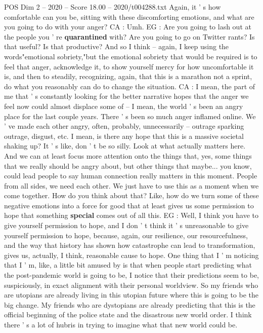 \begin{textsample}{POS Dim 2 – 2020 – Score 18.00 – 2020/t004288.txt}
Again, it ' s how comfortable can you be, sitting with these discomforting emotions, and what are you going to do with your anger?
CA : Umh.
EG : Are you going to lash out at the people you ' re \textbf{quarantined} with?
Are you going to go on Twitter rants?
Is that useful?
Is that productive?
And so I think -- again, I keep using the words"emotional sobriety,"but the emotional sobriety that would be required is to feel that anger, acknowledge it, to show yourself mercy for how uncomfortable it is, and then to steadily, recognizing, again, that this is a marathon not a sprint, do what you reasonably can do to change the situation.
CA : I mean, the part of me that ' s constantly looking for the better narrative hopes that the anger we feel now could almost displace some of -- I mean, the world ' s been an angry place for the last couple years.
There ' s been so much anger inflamed online.
We ' ve made each other angry, often, probably, unnecessarily -- outrage sparking outrage, disgust, etc.
I mean, is there any hope that this is a massive societal shaking up?
It ' s like, don ' t be so silly.
Look at what actually matters here.
And we can at least focus more attention onto the things that, yes, some things that we really should be angry about, but other things that maybe... you know, could lead people to say human connection really matters in this moment.
People from all sides, we need each other.
We just have to use this as a moment when we come together.
How do you think about that?
Like, how do we turn some of these negative emotions into a force for good that at least gives us some permission to hope that something \textbf{special} comes out of all this.
EG : Well, I think you have to give yourself permission to hope, and I don ' t think it ' s unreasonable to give yourself permission to hope, because, again, our resilience, our resourcefulness, and the way that history has shown how catastrophe can lead to transformation, gives us, actually, I think, reasonable cause to hope.
One thing that I ' m noticing that I ' m, like, a little bit amused by is that when people start predicting what the post-pandemic world is going to be, I notice that their predictions seem to be, suspiciously, in exact alignment with their personal worldview.
So my friends who are utopians are already living in this utopian future where this is going to be the big change.
My friends who are dystopians are already predicting that this is the official beginning of the police state and the disastrous new world order.
I think there ' s a lot of hubris in trying to imagine what that new world could be.

\end{textsample}

